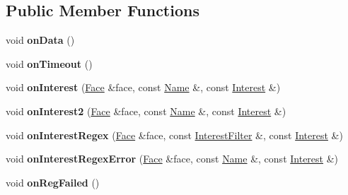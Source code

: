 \subsection*{Public Member Functions}
\begin{DoxyCompactItemize}
\item 
void {\bfseries on\+Data} ()\hypertarget{classndn_1_1tests_1_1FacesFixture_a62c6011c1f07758414661593ab83ced3}{}\label{classndn_1_1tests_1_1FacesFixture_a62c6011c1f07758414661593ab83ced3}

\item 
void {\bfseries on\+Timeout} ()\hypertarget{classndn_1_1tests_1_1FacesFixture_a0dad40e7603188426a844df37dacab7c}{}\label{classndn_1_1tests_1_1FacesFixture_a0dad40e7603188426a844df37dacab7c}

\item 
void {\bfseries on\+Interest} (\hyperlink{classndn_1_1Face}{Face} \&face, const \hyperlink{classndn_1_1Name}{Name} \&, const \hyperlink{classndn_1_1Interest}{Interest} \&)\hypertarget{classndn_1_1tests_1_1FacesFixture_a343aa52afc08e39d5a52e2f2293f1f95}{}\label{classndn_1_1tests_1_1FacesFixture_a343aa52afc08e39d5a52e2f2293f1f95}

\item 
void {\bfseries on\+Interest2} (\hyperlink{classndn_1_1Face}{Face} \&face, const \hyperlink{classndn_1_1Name}{Name} \&, const \hyperlink{classndn_1_1Interest}{Interest} \&)\hypertarget{classndn_1_1tests_1_1FacesFixture_a30179835aed4a42a07fe356aa58b7119}{}\label{classndn_1_1tests_1_1FacesFixture_a30179835aed4a42a07fe356aa58b7119}

\item 
void {\bfseries on\+Interest\+Regex} (\hyperlink{classndn_1_1Face}{Face} \&face, const \hyperlink{classndn_1_1InterestFilter}{Interest\+Filter} \&, const \hyperlink{classndn_1_1Interest}{Interest} \&)\hypertarget{classndn_1_1tests_1_1FacesFixture_adeedacf982d9904e2479649b7dc451e6}{}\label{classndn_1_1tests_1_1FacesFixture_adeedacf982d9904e2479649b7dc451e6}

\item 
void {\bfseries on\+Interest\+Regex\+Error} (\hyperlink{classndn_1_1Face}{Face} \&face, const \hyperlink{classndn_1_1Name}{Name} \&, const \hyperlink{classndn_1_1Interest}{Interest} \&)\hypertarget{classndn_1_1tests_1_1FacesFixture_abd5b5425323986be91dfbb05a249361d}{}\label{classndn_1_1tests_1_1FacesFixture_abd5b5425323986be91dfbb05a249361d}

\item 
void {\bfseries on\+Reg\+Failed} ()\hypertarget{classndn_1_1tests_1_1FacesFixture_ac9aa7b631580eb98cbd5d069cbec84b9}{}\label{classndn_1_1tests_1_1FacesFixture_ac9aa7b631580eb98cbd5d069cbec84b9}


\end{DoxyCompactItemize}
